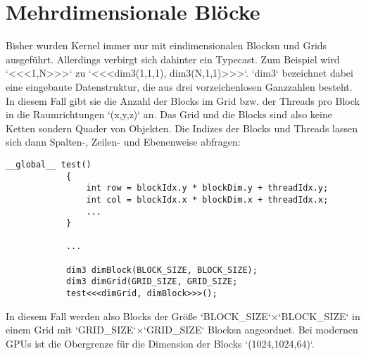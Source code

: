 		\section{Mehrdimensionale Bl\"ocke}
		Bisher wurden \Gls{Kernel} immer nur mit eindimensionalen \Glspl{Block}n und \Glspl{Grid} ausgeführt. Allerdings verbirgt sich dahinter ein Typecast. Zum Beispiel wird \li`<<<1,N>>>` zu \li`<<<dim3(1,1,1), dim3(N,1,1)>>>`. \li`dim3` bezeichnet dabei eine eingebaute Datenstruktur, die aus drei vorzeichenlosen Ganzzahlen besteht. In diesem Fall gibt sie die Anzahl der \Glspl{Block} im \Gls{Grid} bzw. der \Glspl{Thread} pro \Gls{Block} in die Raumrichtungen \li`(x,y,z)` an. Das \Gls{Grid} und die \Glspl{Block} sind also keine Ketten sondern Quader von Objekten. Die Indizes der \Glspl{Block} und \Glspl{Thread} lassen sich dann Spalten-, Zeilen- und Ebenenweise abfragen: 			
		\begin{lstlisting}[caption=~Multidimensionale Blöcke]
			__global__ test()
			{
				int row = blockIdx.y * blockDim.y + threadIdx.y;
				int col = blockIdx.x * blockDim.x + threadIdx.x;
				...
			}
    		
    		...

		    dim3 dimBlock(BLOCK_SIZE, BLOCK_SIZE);
    		dim3 dimGrid(GRID_SIZE, GRID_SIZE;
    		test<<<dimGrid, dimBlock>>>();
		\end{lstlisting}
        In diesem Fall werden also \Glspl{Block} der Größe \li`BLOCK_SIZE`$\times$\li`BLOCK_SIZE` in einem \Gls{Grid} mit \li`GRID_SIZE`$\times$\li`GRID_SIZE` \Glspl{Block}n angeordnet. Bei modernen GPUs ist die Obergrenze für die Dimension der \Glspl{Block} \li`(1024,1024,64)`.
        
